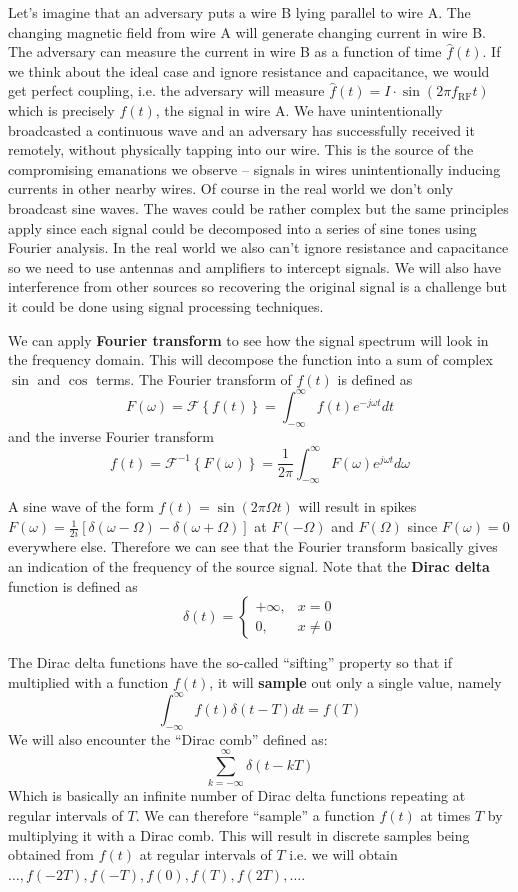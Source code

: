 \documentclass[a4paper,12pt,twoside,openright]{report}
\begin{document}
Let's imagine that an adversary puts a wire B lying parallel to wire A. The changing magnetic field from wire A will generate changing current in wire B. The adversary can measure the current in wire B as a function of time $\hat{f}(t)$. If we think about the ideal case and ignore resistance and capacitance, we would get perfect coupling, i.e. the adversary will measure $\hat{f}(t) = I \cdot \sin(2\pi f_\text{RF} t)$ which is precisely $f(t)$, the signal in wire A. We have unintentionally broadcasted a continuous wave and an adversary has successfully received it remotely, without physically tapping into our wire. This is the source of the compromising emanations we observe -- signals in wires unintentionally inducing currents in other nearby wires. Of course in the real world we don't only broadcast sine waves. The waves could be rather complex but the same principles apply since each signal could be decomposed into a series of sine tones using Fourier analysis. In the real world we also can't ignore resistance and capacitance so we need to use antennas and amplifiers to intercept signals. We will also have interference from other sources so recovering the original signal is a challenge but it could be done using signal processing techniques.

We can apply \textbf{Fourier transform}\cite{briggs1995dft} to see how the signal spectrum will look in the frequency domain. This will decompose the function into a sum of complex $\sin$ and $\cos$ terms. The Fourier transform of $f(t)$ is defined as
$$F(\omega)=\mathcal{F} \left\{ f(t) \right\} = \int_{-\infty}^{\infty} f(t) e^{-j \omega t} dt $$
and the inverse Fourier transform
$$f(t) = \mathcal{F}^{-1} \left\{ F(\omega) \right\} = \frac{1}{2\pi} \int_{-\infty}^{\infty} F(\omega) e^{j \omega t} d\omega$$

A sine wave of the form $f(t) = \sin(2 \pi \Omega t)$ will result in spikes $F(\omega) = \frac{1}{2 i} [\delta(\omega - \Omega) - \delta(\omega
 + \Omega)]$ at $F(-\Omega)$ and $F(\Omega)$ since $F(\omega) = 0$ everywhere else. Therefore we can see that the Fourier transform basically gives an indication of the frequency of the source signal. Note that the \textbf{Dirac delta} function is defined as
$$ \delta(t) = \begin{cases} +\infty, & x = 0 \\ 0, & x \neq 0 \end{cases} $$

The Dirac delta functions have the so-called ``sifting'' property so that if multiplied with a function $f(t)$, it will \textbf{sample} out only a single value, namely
$$ \int_{-\infty}^{\infty} f(t) \delta(t - T) dt = f(T) $$
We will also encounter the ``Dirac comb'' defined as:
$$ \sum_{k=-\infty}^{\infty} \delta(t - kT) $$
Which is basically an infinite number of Dirac delta functions repeating at regular intervals of $T$. We can therefore ``sample'' a function $f(t)$ at times $T$ by multiplying it with a Dirac comb. This will result in discrete samples being obtained from $f(t)$ at regular intervals of $T$ i.e. we will obtain $\dots, f(-2 T), f(-T), f(0), f(T), f(2 T), \dots$.
\end{document}
